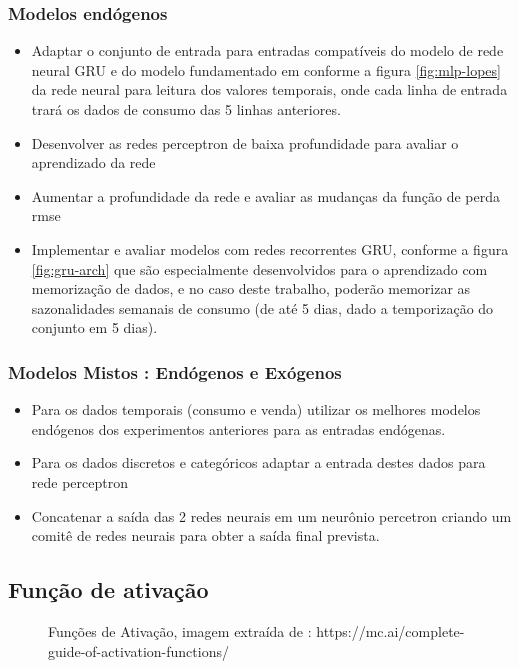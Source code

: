 \documentclass[	12pt, Times, openright, twoside, a4paper, english, brazil]{abntex2}
\begin{document}
         	\subsubsection{Modelos endógenos}
         	\begin{itemize}
             	\item   Adaptar o conjunto de entrada para entradas compatíveis do modelo de rede neural GRU e do modelo fundamentado em \cite{Lopes2008} conforme a figura \ref{fig:mlp-lopes} da rede neural para leitura dos valores temporais, onde cada linha de entrada trará os dados de consumo das 5 linhas anteriores.
                \item	Desenvolver as redes perceptron de baixa profundidade para avaliar o aprendizado da rede
                \item	Aumentar a profundidade da rede e avaliar as mudanças da função de perda rmse
                \item	Implementar e avaliar modelos com redes recorrentes GRU, conforme a figura \ref{fig:gru-arch} que são especialmente desenvolvidos para o aprendizado com memorização de dados, e no caso deste trabalho, poderão memorizar as sazonalidades semanais de consumo (de até 5 dias, dado a temporização do conjunto em 5 dias).
            \end{itemize}
            \subsubsection{Modelos Mistos : Endógenos e Exógenos}
                \begin{itemize}
                    \item Para os dados temporais (consumo e venda) utilizar os melhores modelos endógenos dos experimentos anteriores para as entradas endógenas. 
                    \item Para os dados discretos e categóricos adaptar a entrada destes dados para rede perceptron
                    \item  Concatenar a saída das 2 redes neurais em um neurônio percetron criando um comitê de redes neurais para obter a saída final prevista.
                \end{itemize}
	\subsection{Função de ativação}
	    \begin{figure}[!ht]
        	\caption{Funções de Ativação, imagem extraída de : \cite{MCAI} https://mc.ai/complete-guide-of-activation-functions/ \label{fig:activation_functions}}
        \end{figure}
\end{document}
